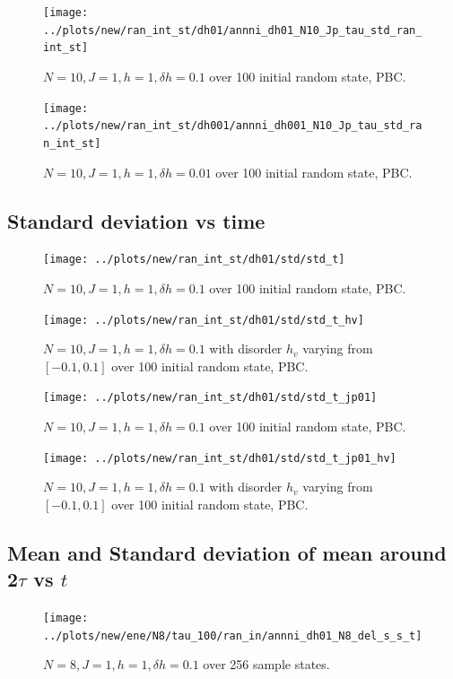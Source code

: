 \documentclass[a4paper]{article}
\begin{document}
\begin{figure}[h!]
  \centering
  \texttt{[image: ../plots/new/ran\_int\_st/dh01/annni\_dh01\_N10\_Jp\_tau\_std\_ran\_int\_st]}
  \caption{$N = 10, J = 1, h = 1, \delta h=0.1$ over 100 initial random state, PBC.}
  \label{fig:}
\end{figure}

\begin{figure}[h!]
  \centering
  \texttt{[image: ../plots/new/ran\_int\_st/dh001/annni\_dh001\_N10\_Jp\_tau\_std\_ran\_int\_st]}
  \caption{$N = 10, J = 1, h = 1, \delta h=0.01$ over 100 initial random state, PBC.}
  \label{fig:}
\end{figure}

\clearpage
\subsection{Standard deviation vs time}
\begin{figure}[h!]
  \centering
  \texttt{[image: ../plots/new/ran\_int\_st/dh01/std/std\_t]}
  \caption{$N = 10, J = 1, h = 1, \delta h=0.1$ over 100 initial random state, PBC.}
  \label{fig:}
\end{figure}

\begin{figure}[h!]
  \centering
  \texttt{[image: ../plots/new/ran\_int\_st/dh01/std/std\_t\_hv]}
  \caption{$N = 10, J = 1, h = 1, \delta h=0.1$ with disorder $h_v$ varying from $[-0.1,0.1]$ over 100 initial random state, PBC.}
  \label{fig:}
\end{figure}

\clearpage
\begin{figure}[h!]
  \centering
  \texttt{[image: ../plots/new/ran\_int\_st/dh01/std/std\_t\_jp01]}
  \caption{$N = 10, J = 1, h = 1, \delta h=0.1$ over 100 initial random state, PBC.}
  \label{fig:}
\end{figure}

\begin{figure}[h!]
  \centering
  \texttt{[image: ../plots/new/ran\_int\_st/dh01/std/std\_t\_jp01\_hv]}
  \caption{$N = 10, J = 1, h = 1, \delta h=0.1$ with disorder $h_v$ varying from $[-0.1,0.1]$ over 100 initial random state, PBC.}
  \label{fig:}
\end{figure}









\clearpage
\subsection{Mean and Standard deviation of mean around 2$\tau$ vs $t$}
\begin{figure}[h!]
  \centering
  \texttt{[image: ../plots/new/ene/N8/tau\_100/ran\_in/annni\_dh01\_N8\_del\_s\_s\_t]}
  \caption{$N = 8, J = 1, h = 1, \delta h=0.1$ over 256 sample states.}
  \label{fig:}
\end{figure}
\end{document}
